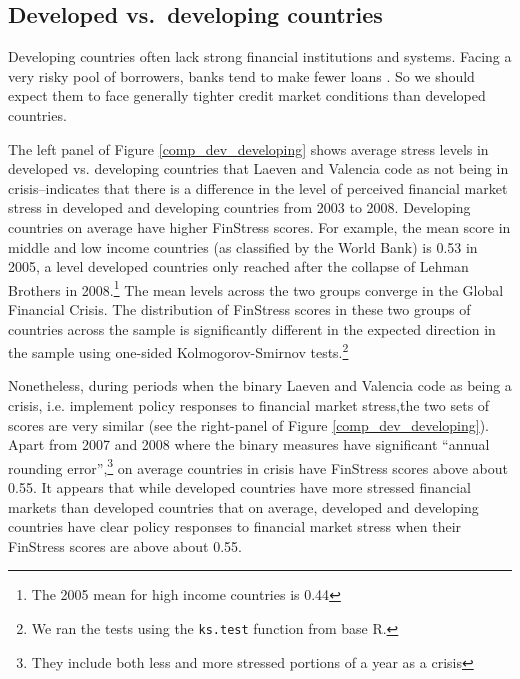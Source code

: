 \documentclass[]{article}
\begin{document}
\subsection*{Developed vs.~developing
countries}\label{developed-vs.developing-countries}

Developing countries often lack strong financial institutions and systems. Facing a very risky pool of borrowers, banks tend to make fewer loans \citep{Andrianova2014}. So we should expect them to face generally tighter credit market conditions than developed countries.

The left panel of Figure \ref{comp_dev_developing} shows average stress levels in developed vs. developing countries that Laeven and Valencia code as not being in crisis--indicates that there is a difference in the level of perceived financial market stress in developed and developing countries from 2003 to 2008. Developing countries on average have higher FinStress scores. For example, the mean score in middle and low income countries (as classified by the World Bank) is 0.53 in 2005, a level developed countries only reached after the collapse of Lehman Brothers in 2008.\footnote{The 2005 mean for high income countries is 0.44} The mean levels across the two groups converge in the Global Financial Crisis. The distribution of FinStress scores in these two groups of countries across the sample is significantly different in the expected direction in the sample using one-sided Kolmogorov-Smirnov tests.\footnote{We ran the tests using the \texttt{ks.test} function from base R.}

Nonetheless, during periods when the binary Laeven and Valencia code as being a crisis, i.e. implement policy responses to financial market stress,the two sets of scores are very similar (see the right-panel of Figure \ref{comp_dev_developing}). Apart from 2007 and 2008 where the binary measures have significant ``annual rounding error'',\footnote{They include both less and more stressed portions of a year as a crisis} on average countries in crisis have FinStress scores above about 0.55. It appears that while developed countries have more stressed financial markets than developed countries that on average, developed and developing countries have clear policy responses to financial market stress when their FinStress scores are above about 0.55.
\end{document}
